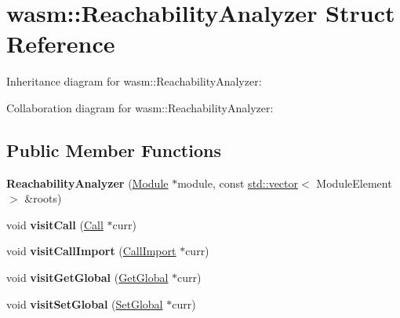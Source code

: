 \hypertarget{structwasm_1_1_reachability_analyzer}{}\section{wasm\+:\+:Reachability\+Analyzer Struct Reference}
\label{structwasm_1_1_reachability_analyzer}


Inheritance diagram for wasm\+:\+:Reachability\+Analyzer\+:


Collaboration diagram for wasm\+:\+:Reachability\+Analyzer\+:
\subsection*{Public Member Functions}
\begin{DoxyCompactItemize}
\item 
\mbox{\label{structwasm_1_1_reachability_analyzer_aac2f2b1fa74ffeaae7b7b2c566f58482}} 
{\bfseries Reachability\+Analyzer} (\mbox{\hyperlink{classwasm_1_1_module}{Module}} $\ast$module, const \mbox{\hyperlink{classstd_1_1vector}{std\+::vector}}$<$ Module\+Element $>$ \&roots)
\item 
\mbox{\label{structwasm_1_1_reachability_analyzer_aa29f42a10f40c9fdad3081d40e424f60}} 
void {\bfseries visit\+Call} (\mbox{\hyperlink{classwasm_1_1_call}{Call}} $\ast$curr)
\item 
\mbox{\label{structwasm_1_1_reachability_analyzer_a0fe13b5340c09b01631e859661659567}} 
void {\bfseries visit\+Call\+Import} (\mbox{\hyperlink{classwasm_1_1_call_import}{Call\+Import}} $\ast$curr)
\item 
\mbox{\label{structwasm_1_1_reachability_analyzer_a7a026ef44ba2aa84834dab2c4392bf09}} 
void {\bfseries visit\+Get\+Global} (\mbox{\hyperlink{classwasm_1_1_get_global}{Get\+Global}} $\ast$curr)
\item 
\mbox{\label{structwasm_1_1_reachability_analyzer_ab741cb624307e5b68cab3a6285e2e01c}} 
void {\bfseries visit\+Set\+Global} (\mbox{\hyperlink{classwasm_1_1_set_global}{Set\+Global}} $\ast$curr)
\end{DoxyCompactItemize}
